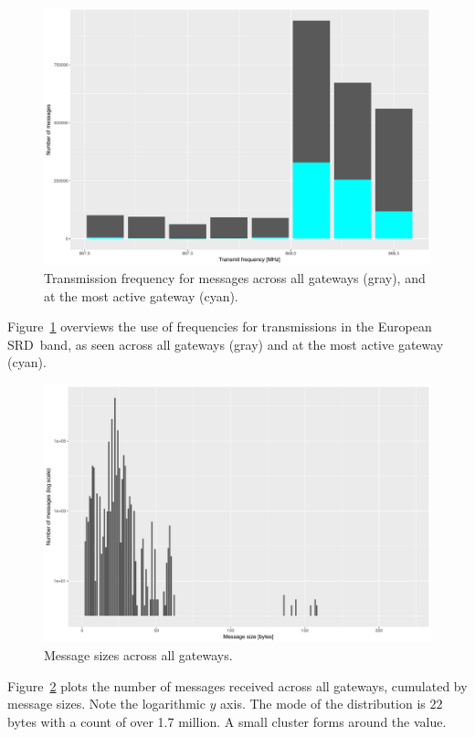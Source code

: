 \begin{figure}
  \centering
  \includegraphics[width=\columnwidth]{figures/qrg.pdf}
  \caption{Transmission frequency for messages across all gateways (gray), and at the most active gateway (cyan).}
  \label{fig:qrg}
\end{figure}

Figure~\ref{fig:qrg} overviews the use of frequencies for transmissions
in the European \gls{SRD} band, as seen across all gateways (gray) and
at the most active gateway (cyan).




\begin{figure}
  \centering
  \includegraphics[width=\columnwidth]{figures/sizes.pdf}
  \caption{Message sizes across all gateways.}
  \label{fig:sizes}
\end{figure}

Figure~\ref{fig:sizes} plots the number of messages received across
all gateways, cumulated by message sizes. Note the logarithmic $y$ axis.
The mode of the distribution is $22$ bytes with a count of over 1.7 million.
A small cluster forms around the value.

